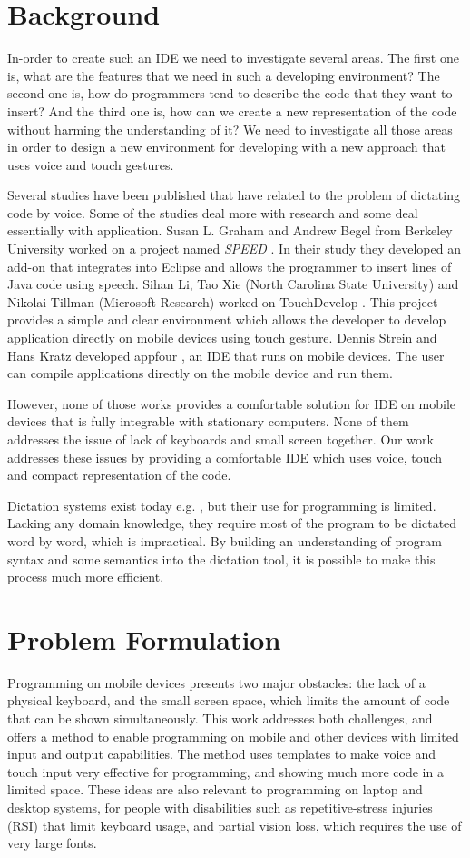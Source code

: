 \section{Background}
In-order to create such an IDE we need to investigate several areas. The first one is, what are the features that we need in such a developing environment? The second one is, how do programmers tend to describe the code that they want to insert? And the third one is, how can we create a new representation of the code without harming the understanding of it? We need to investigate all those areas in order to design a new environment for developing with a new approach that uses voice and touch gestures.

Several studies have been published that have related to the problem of dictating code by voice. Some of the studies deal more with research and some deal essentially with application. Susan L. Graham and Andrew Begel from Berkeley University worked on a project named \textit{SPEED} \cite{andrew11}. In their study they developed an add-on that integrates into Eclipse and allows the programmer to insert lines of Java code using speech. Sihan Li, Tao Xie (North Carolina State University) and Nikolai Tillman (Microsoft Research) worked on TouchDevelop \cite{sihan13}. This project provides a simple and clear environment which allows the developer to develop application directly on mobile devices using touch gesture. Dennis Strein and Hans Kratz developed appfour \cite{appFour12}, an IDE that runs on mobile devices. The user can compile applications directly on the mobile device and run them.

However, none of those works provides a comfortable solution for IDE on mobile devices that is fully integrable with stationary computers. None of them addresses the issue of lack of keyboards and small screen together. Our work addresses these issues by providing a comfortable IDE which uses voice, touch and compact representation of the code.

Dictation systems exist today e.g. \cite{tavis13}, but their use for programming is limited. Lacking any domain knowledge, they require most of the program to be dictated word by word, which is impractical. By building an understanding of program syntax and some semantics into the dictation tool, it is possible to make this process much more efficient.
\section{Problem Formulation}
Programming on mobile devices presents two major obstacles: the lack of a physical keyboard, and the small screen space, which limits the amount of code that can be shown simultaneously. This work addresses both challenges, and offers a method to enable programming on mobile and other devices with limited input and output capabilities. The method uses templates to make voice and touch input very effective for programming, and showing much more code in a limited space. These ideas are also relevant to programming on laptop and desktop systems, for people with disabilities such as repetitive-stress injuries (RSI) that limit keyboard usage, and partial vision loss, which requires the use of very large fonts. 

